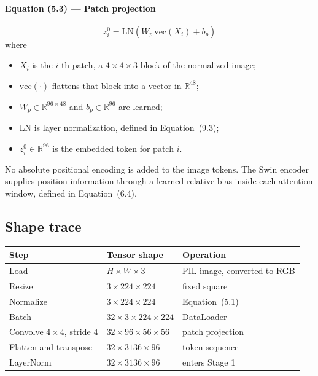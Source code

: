 \documentclass[12pt]{article}
\begin{document}
\paragraph{Equation (5.3) --- Patch projection}
\begin{equation}
z_i^0 = \mathrm{LN}\left(W_p\, \mathrm{vec}(X_i) + b_p\right)
\end{equation}
where
\begin{itemize}[nosep]
\item $X_i$ is the $i$-th patch, a $4\times4\times3$ block of the normalized image;
\item $\mathrm{vec}(\cdot)$ flattens that block into a vector in $\mathbb{R}^{48}$;
\item $W_p \in \mathbb{R}^{96\times48}$ and $b_p \in \mathbb{R}^{96}$ are learned;
\item $\mathrm{LN}$ is layer normalization, defined in Equation~(9.3);
\item $z_i^0 \in \mathbb{R}^{96}$ is the embedded token for patch $i$.
\end{itemize}

No absolute positional encoding is added to the image tokens. The Swin encoder supplies position information through a learned relative bias inside each attention window, defined in Equation~(6.4).

\subsection{Shape trace}

\begin{center}
\begin{tabular}{@{}lll@{}}
\toprule
Step & Tensor shape & Operation \\
\midrule
Load & $H \times W \times 3$ & PIL image, converted to RGB \\
Resize & $3\times224\times224$ & fixed square \\
Normalize & $3\times224\times224$ & Equation~(5.1) \\
Batch & $32\times3\times224\times224$ & DataLoader \\
Convolve $4\times4$, stride 4 & $32\times96\times56\times56$ & patch projection \\
Flatten and transpose & $32\times3136\times96$ & token sequence \\
LayerNorm & $32\times3136\times96$ & enters Stage 1 \\
\bottomrule
\end{tabular}
\end{center}
\end{document}
